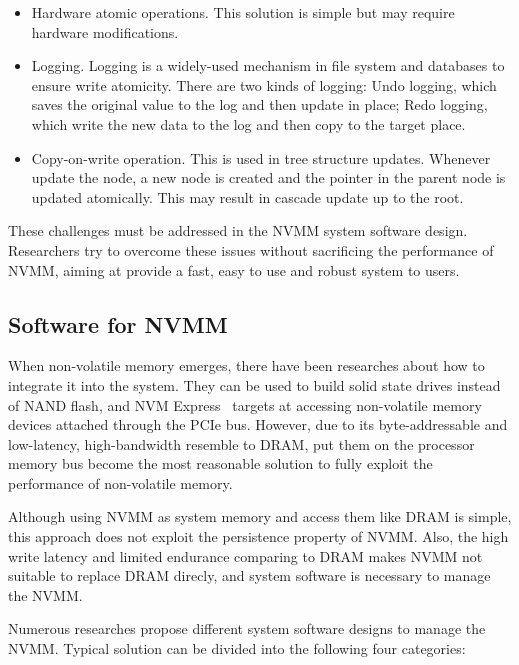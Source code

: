 \begin{itemize}
\item Hardware atomic operations. This solution is simple but may require
hardware modifications.
\item Logging. Logging is a widely-used mechanism in file system and databases
to ensure write atomicity. There are two kinds of logging: Undo logging, which
saves the original value to the log and then update in place; Redo logging,
which write the new data to the log and then copy to the target place.
\item Copy-on-write operation. This is used in tree structure updates. Whenever
update the node, a new node is created and the pointer in the parent node is
updated atomically. This may result in cascade update up to the root.
\end{itemize}

These challenges must be addressed in the NVMM system software design.
Researchers try to overcome these issues without sacrificing the performance
of NVMM, aiming at provide a fast, easy to use and robust system to users.


\subsection{Software for NVMM}
\label{sec:NVMM}

When non-volatile memory emerges, there have been researches about how to
integrate it into the system. They can be used to build solid state drives
instead of NAND flash, and NVM Express~\cite{NVMe} targets at accessing
non-volatile memory devices attached through the PCIe bus. However, due to
its byte-addressable and low-latency, high-bandwidth resemble to DRAM,
put them on the processor memory bus become the most reasonable solution
to fully exploit the performance of non-volatile memory.

Although using NVMM as system memory and access them like DRAM is simple,
this approach does not exploit the persistence property of NVMM. Also, the
high write latency and limited endurance comparing to DRAM makes NVMM not
suitable to replace DRAM direcly, and system software is necessary to
manage the NVMM.

Numerous researches propose different system software designs to
manage the NVMM. Typical solution can be divided into the following
four categories:

